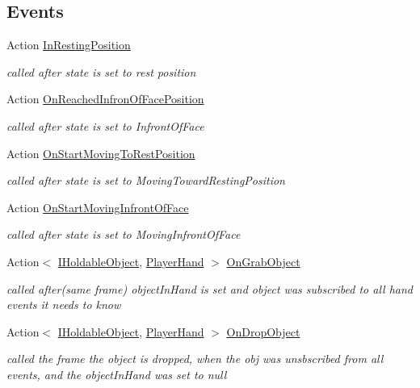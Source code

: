 \subsection*{Events}
\begin{DoxyCompactItemize}
\item 
Action \mbox{\hyperlink{class_player_hand_a3a8432e3dbd04a1c12c95ca0c0fd186b}{In\+Resting\+Position}}
\begin{DoxyCompactList}\small\item\em called after state is set to rest position \end{DoxyCompactList}\item 
Action \mbox{\hyperlink{class_player_hand_a9f27078422ba536d94e6fb76e093cf7c}{On\+Reached\+Infron\+Of\+Face\+Position}}
\begin{DoxyCompactList}\small\item\em called after state is set to Infront\+Of\+Face \end{DoxyCompactList}\item 
Action \mbox{\hyperlink{class_player_hand_ac82ac43be97123cde5f02f5811a63397}{On\+Start\+Moving\+To\+Rest\+Position}}
\begin{DoxyCompactList}\small\item\em called after state is set to Moving\+Toward\+Resting\+Position \end{DoxyCompactList}\item 
Action \mbox{\hyperlink{class_player_hand_ab33d70a8efd0adeed59aa3f5a5747349}{On\+Start\+Moving\+Infront\+Of\+Face}}
\begin{DoxyCompactList}\small\item\em called after state is set to Moving\+Infront\+Of\+Face \end{DoxyCompactList}\item 
Action$<$ \mbox{\hyperlink{interface_i_holdable_object}{I\+Holdable\+Object}}, \mbox{\hyperlink{class_player_hand}{Player\+Hand}} $>$ \mbox{\hyperlink{class_player_hand_af3875f350ce765612b5af99e8e9d5837}{On\+Grab\+Object}}
\begin{DoxyCompactList}\small\item\em called after(same frame) object\+In\+Hand is set and object was subscribed to all hand events it needs to know \end{DoxyCompactList}\item 
Action$<$ \mbox{\hyperlink{interface_i_holdable_object}{I\+Holdable\+Object}}, \mbox{\hyperlink{class_player_hand}{Player\+Hand}} $>$ \mbox{\hyperlink{class_player_hand_ac22e288fe18167393a51eec5ad0cbfc0}{On\+Drop\+Object}}
\begin{DoxyCompactList}\small\item\em called the frame the object is dropped, when the obj was unsbscribed from all events, and the object\+In\+Hand was set to null \end{DoxyCompactList}\end{DoxyCompactItemize}
